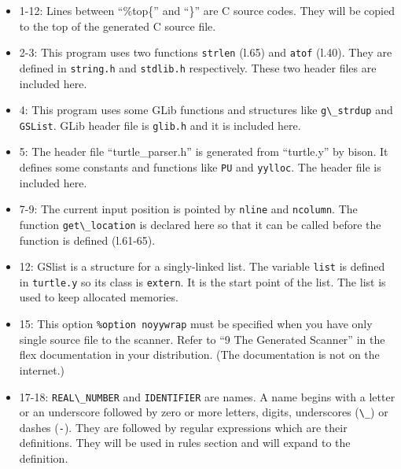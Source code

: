 \begin{itemize}
\tightlist
\item
  1-12: Lines between ``\%top\{'' and ``\}'' are C source codes. They
  will be copied to the top of the generated C source file.
\item
  2-3: This program uses two functions \passthrough{\lstinline!strlen!}
  (l.65) and \passthrough{\lstinline!atof!} (l.40). They are defined in
  \passthrough{\lstinline!string.h!} and
  \passthrough{\lstinline!stdlib.h!} respectively. These two header
  files are included here.
\item
  4: This program uses some GLib functions and structures like
  \passthrough{\lstinline!g\_strdup!} and
  \passthrough{\lstinline!GSList!}. GLib header file is
  \passthrough{\lstinline!glib.h!} and it is included here.
\item
  5: The header file ``turtle\_parser.h'' is generated from ``turtle.y''
  by bison. It defines some constants and functions like
  \passthrough{\lstinline!PU!} and \passthrough{\lstinline!yylloc!}. The
  header file is included here.
\item
  7-9: The current input position is pointed by
  \passthrough{\lstinline!nline!} and \passthrough{\lstinline!ncolumn!}.
  The function \passthrough{\lstinline!get\_location!} is declared here
  so that it can be called before the function is defined (l.61-65).
\item
  12: GSlist is a structure for a singly-linked list. The variable
  \passthrough{\lstinline!list!} is defined in
  \passthrough{\lstinline!turtle.y!} so its class is
  \passthrough{\lstinline!extern!}. It is the start point of the list.
  The list is used to keep allocated memories.
\item
  15: This option \passthrough{\lstinline!\%option noyywrap!} must be
  specified when you have only single source file to the scanner. Refer
  to ``9 The Generated Scanner'' in the flex documentation in your
  distribution. (The documentation is not on the internet.)
\item
  17-18: \passthrough{\lstinline!REAL\_NUMBER!} and
  \passthrough{\lstinline!IDENTIFIER!} are names. A name begins with a
  letter or an underscore followed by zero or more letters, digits,
  underscores (\passthrough{\lstinline!\_!}) or dashes
  (\passthrough{\lstinline!-!}). They are followed by regular
  expressions which are their definitions. They will be used in rules
  section and will expand to the definition.
\end{itemize}

